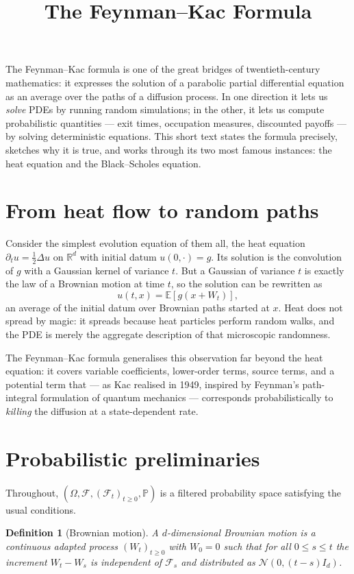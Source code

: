 \documentclass{article}
\title{The Feynman--Kac Formula}
\newtheorem{definition}{Definition}
\newcommand{\concept}[2]{#1}
\begin{document}
The Feynman--Kac formula is one of the great bridges of twentieth-century mathematics: it expresses the solution of a parabolic partial differential equation as an average over the paths of a diffusion process. In one direction it lets us \emph{solve} PDEs by running random simulations; in the other, it lets us compute probabilistic quantities --- exit times, occupation measures, discounted payoffs --- by solving deterministic equations. This short text states the formula precisely, sketches why it is true, and works through its two most famous instances: the heat equation and the Black--Scholes equation.

\section{From heat flow to random paths}

Consider the simplest evolution equation of them all, the \concept{heat equation}{heat-equation} $\partial_t u = \tfrac{1}{2}\Delta u$ on $\mathbb{R}^d$ with initial datum $u(0,\cdot) = g$. Its solution is the convolution of $g$ with a Gaussian kernel of variance $t$. But a Gaussian of variance $t$ is exactly the law of a \concept{Brownian motion}{brownian-motion} at time $t$, so the solution can be rewritten as
\[
u(t,x) = \mathbb{E}\left[ g(x + W_t) \right],
\]
an average of the initial datum over Brownian paths started at $x$. Heat does not spread by magic: it spreads because heat particles perform random walks, and the PDE is merely the aggregate description of that microscopic randomness.

The Feynman--Kac formula generalises this observation far beyond the heat equation: it covers variable coefficients, lower-order terms, source terms, and a potential term that --- as Kac realised in 1949, inspired by Feynman's path-integral formulation of quantum mechanics --- corresponds probabilistically to \emph{killing} the diffusion at a state-dependent rate.

\section{Probabilistic preliminaries}

Throughout, $(\Omega, \mathcal{F}, (\mathcal{F}_t)_{t \ge 0}, \mathbb{P})$ is a filtered probability space satisfying the usual conditions.

\begin{definition}[Brownian motion]
A $d$-dimensional \concept{Brownian motion}{brownian-motion} is a continuous adapted process $(W_t)_{t \ge 0}$ with $W_0 = 0$ such that for all $0 \le s \le t$ the increment $W_t - W_s$ is independent of $\mathcal{F}_s$ and distributed as $\mathcal{N}(0, (t-s) I_d)$.
\end{definition}
\end{document}

